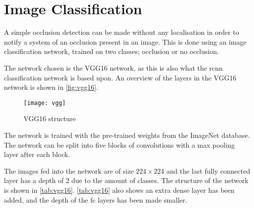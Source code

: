 %
%
%
\section{Image Classification}
A simple occlusion detection can be made without any localisation in order to notify a system of an occlusion present in an image. This is done using an image classification network, trained on two classes; occlusion or no occlusion.

The network chosen is the VGG16 network, as this is also what the \gls{rcnn} classification network is based upon. An overview of the layers in the VGG16 network is shown in \autoref{fig:vgg16}.

\begin{figure}[H]
	\centering
	\texttt{[image: vgg]}
	\caption{VGG16 structure}
	\label{fig:vgg16}
\end{figure}

The network is trained with the pre-trained weights from the ImageNet database. The network can be split into five blocks of convolutions with a max pooling layer after each block.

The images fed into the network are of size $224 \times 224$ and the last fully connected layer has a depth of $2$ due to the amount of classes. The structure of the network is shown in \autoref{tab:vgg16}. \autoref{tab:vgg16} also shows an extra dense layer has been added, and the depth of the \gls{fc} layers has been made smaller.

